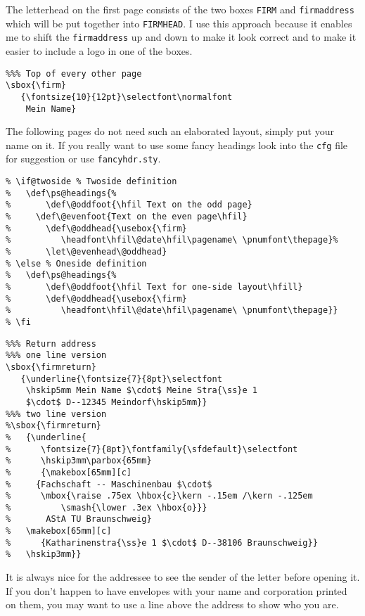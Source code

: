 \documentclass[a4paper]{article}
\begin{document}
The letterhead on the first page consists of the two boxes
\texttt{FIRM} and \texttt{firmaddress} which will be put together into
\texttt{FIRMHEAD}. I use this approach because it enables me to shift
the \texttt{firmaddress} up and down to make it look correct and to
make it easier to include a logo in one of the boxes.

\begin{verbatim}
%%% Top of every other page
\sbox{\firm}
   {\fontsize{10}{12pt}\selectfont\normalfont
    Mein Name}
\end{verbatim}

The following pages do not need such an elaborated layout, simply put 
your name on it. If you really want to use some fancy headings look 
into the \verb+cfg+ file for suggestion or use \verb+fancyhdr.sty+.

\begin{verbatim}
% \if@twoside % Twoside definition
%   \def\ps@headings{%
%       \def\@oddfoot{\hfil Text on the odd page}
% 	  \def\@evenfoot{Text on the even page\hfil}
%       \def\@oddhead{\usebox{\firm}
%          \headfont\hfil\@date\hfil\pagename\ \pnumfont\thepage}%
%       \let\@evenhead\@oddhead}
% \else % Oneside definition
%   \def\ps@headings{%
%       \def\@oddfoot{\hfil Text for one-side layout\hfill}
%       \def\@oddhead{\usebox{\firm}
%          \headfont\hfil\@date\hfil\pagename\ \pnumfont\thepage}}
% \fi
\end{verbatim}

\begin{verbatim}
%%% Return address
%%% one line version
\sbox{\firmreturn}
   {\underline{\fontsize{7}{8pt}\selectfont
    \hskip5mm Mein Name $\cdot$ Meine Stra{\ss}e 1
    $\cdot$ D--12345 Meindorf\hskip5mm}}
%%% two line version
%\sbox{\firmreturn}
%   {\underline{
%      \fontsize{7}{8pt}\fontfamily{\sfdefault}\selectfont
%      \hskip3mm\parbox{65mm}
%      {\makebox[65mm][c]
%	  {Fachschaft -- Maschinenbau $\cdot$
%	   \mbox{\raise .75ex \hbox{c}\kern -.15em /\kern -.125em
%	       \smash{\lower .3ex \hbox{o}}}
%		AStA TU Braunschweig}
%	\makebox[65mm][c]
%	   {Katharinenstra{\ss}e 1 $\cdot$ D--38106 Braunschweig}}
%   \hskip3mm}}
\end{verbatim}

It is always nice for the addressee to see the sender of the letter 
before opening it. If you don't happen to have envelopes with your 
name and corporation printed on them, you may want to use a line 
above the address to show who you are. 
\end{document}
